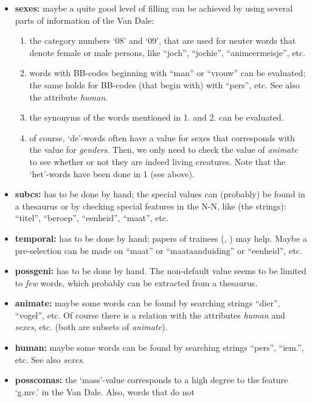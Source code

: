 \begin{itemize}
  \item {\bf sexes:} maybe a quite good level of filling can be achieved by 
        using several parts of information of the Van Dale:
\begin{enumerate}
     \item the category numbers `08' and `09', that are used for neuter words 
           that denote female or male persons, like ``joch'', 
           ``jochie'', ``animeermeisje'', etc.
     \item words with BB-codes beginning with ``man'' or ``vrouw'' can be 
           evaluated; the same holds for BB-codes (that begin with) with 
           ``pers'', etc. See also the attribute {\em human}.
     \item the synonyms of the words mentioned in 1. and 2. can be evaluated.
     \item of course, `de'-words often have a value for sexes that corresponds 
           with the value for {\em genders}. Then, we only need to check the
           value of {\em animate} to see whether or not they are indeed living 
           creatures.
           Note that the `het'-words have been done in 1 (see above).
\end{enumerate}
  \item {\bf subcs:} has to be done by hand; the special values can (probably) 
        be found in a thesaurus or by checking special features in the N-N,
        like (the strings):
        ``titel'', ``beroep'', ``eenheid'', ``maat'', etc.
  \item {\bf temporal:} has to be done by hand; papers of trainees (\cite{po:tp},
        \cite{ko:ta}) may help.
        Maybe a pre-selection can be made on ``maat'' or ``maataanduiding'' or 
        ``eenheid'', etc.
  \item {\bf possgeni:} has to be done by hand. The non-default value seems to 
        be limited to {\em few} words, which probably can be extracted from a
        thesaurus.
  \item {\bf animate:} maybe some words can be found by searching strings
        ``dier'', ``vogel'', etc. Of course there is a relation with the 
        attributes {\em human} and {\em sexes}, etc. (both are subsets 
        of {\em animate}). 
  \item {\bf human:} maybe some words can be found by searching strings
        ``pers'', ``iem.'', etc. See also {\em sexes}.
  \item {\bf posscomas:} the `mass'-value corresponds to a high 
        degree to the feature `g.mv.' in the Van Dale. Also, words that do not 

\end{itemize}
